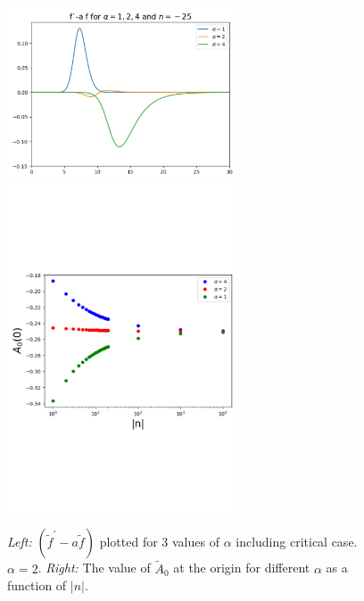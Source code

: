 \begin{figure}[h]
\begin{center}
    \includegraphics[width=2.7in]{Chapter_2_Folder_1912.11321/figures/BPS_equation_error.pdf}\qquad\includegraphics[width=2.7in]{Chapter_2_Folder_1912.11321/figures/negative_n_A0.pdf}
     \caption{{\small {\it Left: }$\left(\tilde f^\prime - a \tilde f\right)$ plotted for 3 values of $\alpha$ including critical case. $\alpha=2$. {\it Right:} The value of $\tilde A_0$ at the origin for different $\alpha$ as a function of $|n|$. }} \label{fig:error}
    \end{center}
\end{figure}

